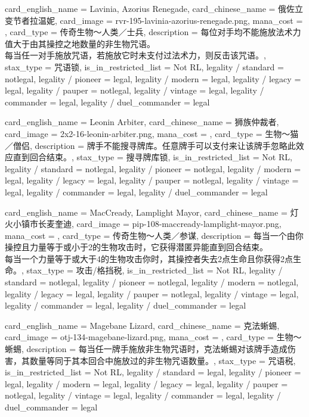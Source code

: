 \documentclass[lang = cn, color = black, 10pt]{AllThatStax}
\begin{document}
\card
{
	card_english_name = {Lavinia, Azorius Renegade},
	card_chinese_name = {俄佐立变节者拉温妮},
	card_image = rvr-195-lavinia-azorius-renegade.png,
	mana_cost = ,
	card_type = 传奇生物～人类／士兵,
	description = {每位对手均不能施放法术力值大于由其操控之地数量的非生物咒语。\\
每当任一对手施放咒语，若施放它时未支付过法术力，则反击该咒语。},
	stax_type = 咒语锁,
	is_in_restricted_list = Not RL,
	legality / standard = notlegal,
	legality / pioneer = legal,
	legality / modern = legal,
	legality / legacy = legal,
	legality / pauper = notlegal,
	legality / vintage = legal,
	legality / commander = legal,
	legality / duel_commander = legal
}

\card
{
	card_english_name = {Leonin Arbiter},
	card_chinese_name = {狮族仲裁者},
	card_image = 2x2-16-leonin-arbiter.png,
	mana_cost = ,
	card_type = 生物～猫／僧侣,
	description = {牌手不能搜寻牌库。任意牌手可以支付来让该牌手忽略此效应直到回合结束。},
	stax_type = 搜寻牌库锁,
	is_in_restricted_list = Not RL,
	legality / standard = notlegal,
	legality / pioneer = notlegal,
	legality / modern = legal,
	legality / legacy = legal,
	legality / pauper = notlegal,
	legality / vintage = legal,
	legality / commander = legal,
	legality / duel_commander = legal
}

\card
{
	card_english_name = {MacCready, Lamplight Mayor},
	card_chinese_name = {灯火小镇市长麦奎迪},
	card_image = pip-108-maccready-lamplight-mayor.png,
	mana_cost = ,
	card_type = 传奇生物～人类／参谋,
	description = {每当一个由你操控且力量等于或小于2的生物攻击时，它获得潜匿异能直到回合结束。\\
每当一个力量等于或大于4的生物攻击你时，其操控者失去2点生命且你获得2点生命。},
	stax_type = 攻击/格挡税,
	is_in_restricted_list = Not RL,
	legality / standard = notlegal,
	legality / pioneer = notlegal,
	legality / modern = notlegal,
	legality / legacy = legal,
	legality / pauper = notlegal,
	legality / vintage = legal,
	legality / commander = legal,
	legality / duel_commander = legal
}

\card
{
	card_english_name = {Magebane Lizard},
	card_chinese_name = {克法蜥蜴},
	card_image = otj-134-magebane-lizard.png,
	mana_cost = ,
	card_type = 生物～蜥蜴,
	description = {每当任一牌手施放非生物咒语时，克法蜥蜴对该牌手造成伤害，其数量等同于其本回合中施放过的非生物咒语数量。},
	stax_type = 咒语税,
	is_in_restricted_list = Not RL,
	legality / standard = legal,
	legality / pioneer = legal,
	legality / modern = legal,
	legality / legacy = legal,
	legality / pauper = notlegal,
	legality / vintage = legal,
	legality / commander = legal,
	legality / duel_commander = legal
}
\end{document}
